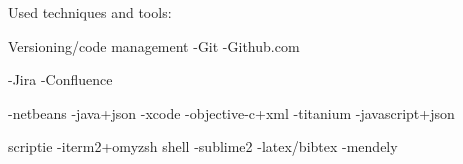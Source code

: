 Used techniques and tools:

Versioning/code management
-Git
-Github.com

-Jira
-Confluence

-netbeans
	-java+json
-xcode
	-objective-c+xml
-titanium
	-javascript+json


scriptie
-iterm2+omyzsh shell
-sublime2
-latex/bibtex
-mendely
